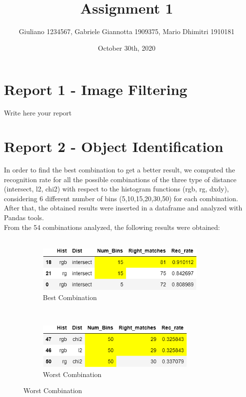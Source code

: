 \documentclass[
	12pt, %
]{fphw}
\title{Assignment 1} %
\author{Giuliano  1234567, Gabriele Giannotta 1909375, Mario Dhimitri 1910181 } %
\date{October 30th, 2020} %
\institute{Sapienza Università di Roma \\ Data Science} %
\begin{document}
\maketitle %


\section*{Report 1 - Image Filtering}

Write here your report


\newpage
\section*{Report 2 - Object Identification}


In order to find the best combination to get a better result, we computed the recognition rate for all the possible combinations of the three type of distance (intersect, l2, chi2) with respect to the histogram functions (rgb, rg, dxdy), considering 6 different number of bins (5,10,15,20,30,50) for each combination. After that, the obtained results were inserted in a dataframe and analyzed with Pandas tools. \\
From the 54 combinations analyzed, the following results were obtained:\\ \\


\begin{figure}[h!]
    \centering
    \begin{subfigure}[t]{0.5\textwidth}
        \centering
        \includegraphics[height=0.9in]{img/best_combination.png}
         \caption{Best Combination}
    \end{subfigure}%
    ~ 
    \begin{subfigure}[t]{0.5\textwidth}
        \centering
        \includegraphics[height=0.9in]{img/worst_combination.png}
         \caption{Worst Combination}
	\end{subfigure}

\end{figure}
\end{document}

